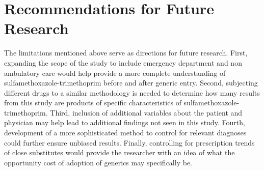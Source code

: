 \section{Recommendations for Future Research}
The limitations mentioned above serve as directions for future research. First, expanding the scope of the study to include emergency department and non ambulatory care would help provide a more complete understanding of sulfamethoxazole-trimethoprim before and after generic entry. Second, subjecting different drugs to a similar methodology is needed to determine how many results from this study are products of specific characteristics of sulfamethoxazole-trimethoprim. Third, inclusion of additional variables about the patient and physician may help lead to additional findings not seen in this study. Fourth, development of a more sophisticated method to control for relevant diagnoses could further ensure unbiased results. Finally, controlling for prescription trends of close substitutes would provide the researcher with an idea of what the opportunity cost of adoption of generics may specifically be. 